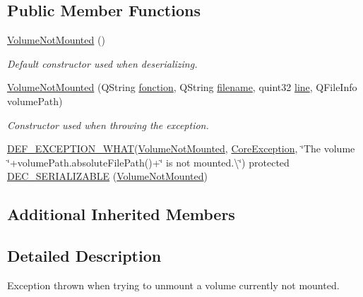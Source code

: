 \subsection*{Public Member Functions}
\begin{DoxyCompactItemize}
\item 
\hyperlink{class_gost_crypt_1_1_core_1_1_volume_not_mounted_aeeba3bab523e7fa3ceba5d3275da68f6}{Volume\+Not\+Mounted} ()
\begin{DoxyCompactList}\small\item\em Default constructor used when deserializing. \end{DoxyCompactList}\item 
\hyperlink{class_gost_crypt_1_1_core_1_1_volume_not_mounted_a8db6f5942516c263c0d3258c68c6fd4e}{Volume\+Not\+Mounted} (Q\+String \hyperlink{class_gost_crypt_1_1_gost_crypt_exception_a29b8c93d5efbb1ff369107385725a939}{fonction}, Q\+String \hyperlink{class_gost_crypt_1_1_gost_crypt_exception_a749a12375f4ba9d502623b99d8252f38}{filename}, quint32 \hyperlink{class_gost_crypt_1_1_gost_crypt_exception_abf506d911f12a4e969eea500f90bd32c}{line}, Q\+File\+Info volume\+Path)
\begin{DoxyCompactList}\small\item\em Constructor used when throwing the exception. \end{DoxyCompactList}\item 
\hyperlink{_gost_crypt_exception_8h_a5bc1e1c6c9d6f46c84eeba49e33355f9}{D\+E\+F\+\_\+\+E\+X\+C\+E\+P\+T\+I\+O\+N\+\_\+\+W\+H\+AT}(\hyperlink{class_gost_crypt_1_1_core_1_1_volume_not_mounted}{Volume\+Not\+Mounted}, \hyperlink{class_gost_crypt_1_1_core_1_1_core_exception}{Core\+Exception}, \char`\"{}The volume \char`\"{}+volume\+Path.\+absolute\+File\+Path()+\char`\"{} is not mounted.\textbackslash{}\char`\"{}) protected \hyperlink{class_gost_crypt_1_1_core_1_1_volume_not_mounted_ab22b6c4d90d83b8ab5e13023a794a2e0}{D\+E\+C\+\_\+\+S\+E\+R\+I\+A\+L\+I\+Z\+A\+B\+LE} (\hyperlink{class_gost_crypt_1_1_core_1_1_volume_not_mounted}{Volume\+Not\+Mounted})
\end{DoxyCompactItemize}
\subsection*{Additional Inherited Members}


\subsection{Detailed Description}
Exception thrown when trying to unmount a volume currently not mounted. 

